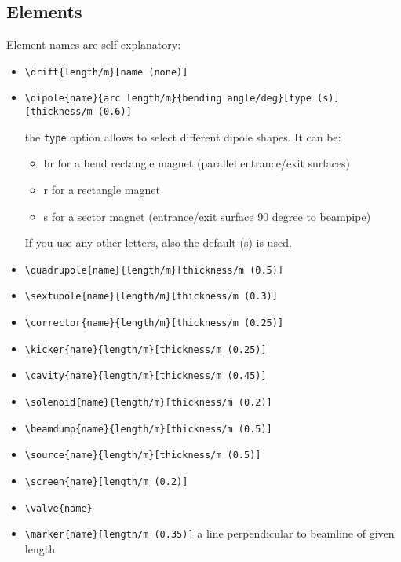 \documentclass[colorlinks]{scrartcl}
\begin{document}
\subsection{Elements}
\label{sec-5-1}
Element names are self-explanatory:

\begin{itemize}
\item \verb+\drift{length/m}[name (none)]+
\item
\begin{verbatim}
\dipole{name}{arc length/m}{bending angle/deg}[type (s)][thickness/m (0.6)]
\end{verbatim}

the \verb+type+ option allows to select different dipole shapes. It can be:
\begin{itemize}
\item br for a bend rectangle magnet (parallel entrance/exit surfaces)
\item r for a rectangle magnet
\item s for a sector magnet (entrance/exit surface 90 degree to beampipe)
\end{itemize}
If you use any other letters, also the default (s) is used.
\item \verb+\quadrupole{name}{length/m}[thickness/m (0.5)]+
\item \verb+\sextupole{name}{length/m}[thickness/m (0.3)]+
\item \verb+\corrector{name}{length/m}[thickness/m (0.25)]+
\item \verb+\kicker{name}{length/m}[thickness/m (0.25)]+
\item \verb+\cavity{name}{length/m}[thickness/m (0.45)]+
\item \verb+\solenoid{name}{length/m}[thickness/m (0.2)]+
\item \verb+\beamdump{name}{length/m}[thickness/m (0.5)]+
\item \verb+\source{name}{length/m}[thickness/m (0.5)]+
\item \verb+\screen{name}[length/m (0.2)]+
\item \verb+\valve{name}+
\item \verb+\marker{name}[length/m (0.35)]+ a line perpendicular to beamline of given length
\end{itemize}
\end{document}
